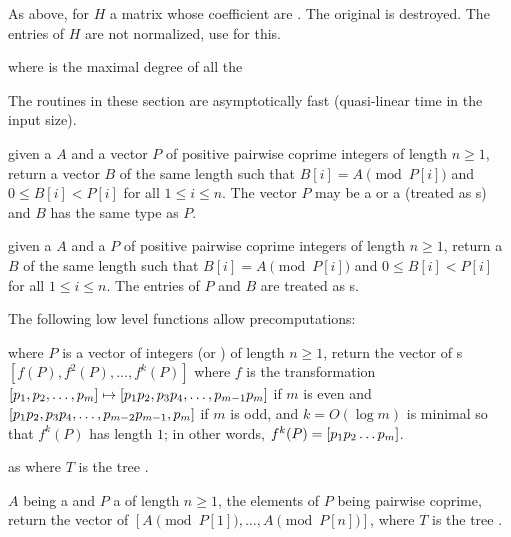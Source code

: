 

As above, for $H$ a matrix whose coefficient are .
The original  is destroyed.
The entries of $H$ are not normalized, use 
for this.

 where 
is the maximal degree of all the 



The routines in these section are asymptotically fast (quasi-linear time in
the input size).

 given a  $A$ and a vector $P$ of
positive pairwise coprime integers of length $n\ge 1$, return a vector $B$ of
the same length such that $B[i] = A\pmod{P[i]}$ and $0\leq B[i] < P[i]$ for
all $1\leq i\leq n$. The vector $P$ may be a  or a 
(treated as s) and $B$ has the same type as $P$.

 given a  $A$ and a 
$P$ of positive pairwise coprime integers of length $n\ge 1$, return a
 $B$ of the same length such that $B[i]=A\pmod{P[i]}$ and
$0\leq B[i] < P[i]$ for all $1\leq i\leq n$. The entries of $P$ and $B$ are
treated as s.

The following low level functions allow precomputations:

 where $P$ is a vector of integers (or
) of length $n\ge 1$, return the vector of s
$[f(P),f^2(P),\ldots,f^k(P)]$ where $f$ is the transformation
$[p_1,p_2,\ldots,p_m] \mapsto [p_1\*p_2,p_3\*p_4,\ldots,p_{m-1}\*p_m]$ if $m$
is even and $[p_1\*p_2,p_3\*p_4,\ldots,p_{m-2}\*p_{m-1},p_m]$ if $m$ is odd,
and $k = O(\log m)$ is minimal so that $f^k(P)$ has length $1$; in other
words, $f^k(P) = [p_1\*p_2\*\ldots\*p_m]$.

as  where $T$ is the tree .

 $A$ being a 
and $P$ a  of length $n\ge 1$, the elements of $P$ being
pairwise coprime, return the vector of 
$[A \pmod{P[1]},\ldots,A \pmod{P[n]}]$,
where $T$ is the tree .

